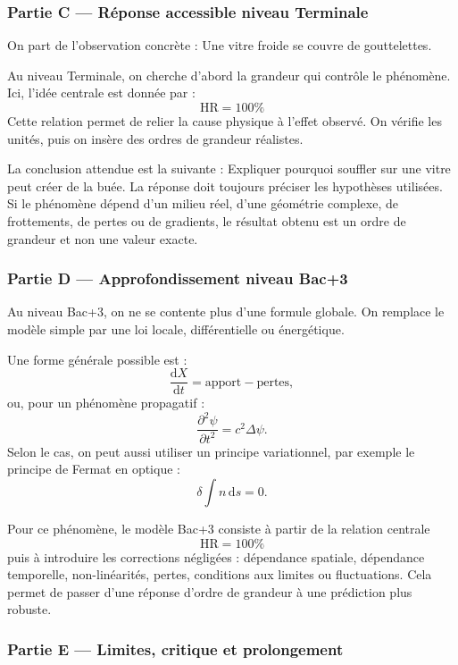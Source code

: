 \documentclass[11pt,a4paper]{article}
\begin{document}
\subsubsection*{Partie C — Réponse accessible niveau Terminale}

\begin{corrigebox}
On part de l'observation concrète : Une vitre froide se couvre de gouttelettes.

Au niveau Terminale, on cherche d'abord la grandeur qui contrôle le phénomène. Ici, l'idée centrale est donnée par :
\[
\mathrm{HR}=100\%
\]
Cette relation permet de relier la cause physique à l'effet observé. On vérifie les unités, puis on insère des ordres de grandeur réalistes.

La conclusion attendue est la suivante : Expliquer pourquoi souffler sur une vitre peut créer de la buée. La réponse doit toujours préciser les hypothèses utilisées. Si le phénomène dépend d'un milieu réel, d'une géométrie complexe, de frottements, de pertes ou de gradients, le résultat obtenu est un ordre de grandeur et non une valeur exacte.
\end{corrigebox}

\subsubsection*{Partie D — Approfondissement niveau Bac+3}

\begin{approfondissementbox}
Au niveau Bac+3, on ne se contente plus d'une formule globale. On remplace le modèle simple par une loi locale, différentielle ou énergétique.

Une forme générale possible est :
\[
\frac{\mathrm d X}{\mathrm dt}=\text{apport}-\text{pertes},
\]
ou, pour un phénomène propagatif :
\[
\frac{\partial^2 \psi}{\partial t^2}=c^2\Delta\psi.
\]
Selon le cas, on peut aussi utiliser un principe variationnel, par exemple le principe de Fermat en optique :
\[
\delta \int n\,\mathrm ds=0.
\]

Pour ce phénomène, le modèle Bac+3 consiste à partir de la relation centrale
\[
\mathrm{HR}=100\%
\]
puis à introduire les corrections négligées : dépendance spatiale, dépendance temporelle, non-linéarités, pertes, conditions aux limites ou fluctuations. Cela permet de passer d'une réponse d'ordre de grandeur à une prédiction plus robuste.
\end{approfondissementbox}

\subsubsection*{Partie E — Limites, critique et prolongement}
\end{document}
